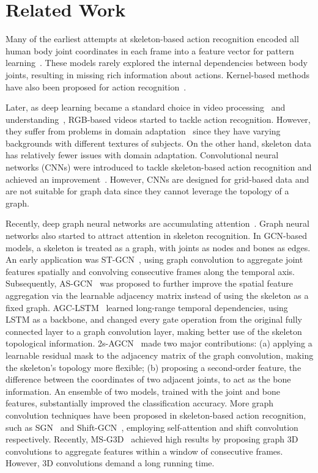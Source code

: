 \documentclass[journal,comsoc]{IEEEtran}
\begin{document}
\section{Related Work}
Many of the earliest attempts at skeleton-based action recognition encoded all human body joint coordinates in each frame into a feature vector for pattern learning~\cite{lei2017,lei_tip2019}. These models rarely explored the internal dependencies between body joints, resulting in missing rich information about actions. Kernel-based methods have also been proposed for action recognition~\cite{koniusz2016tensor, koniusz2020tensor}. 

Later, as deep learning became a standard choice in video processing~\cite{liu2021invertible,anwar2020densely} and understanding~\cite{li2020transferring,li2020word}, RGB-based videos started to tackle action recognition. However, they suffer from problems in domain adaptation~\cite{zhang2020clarinet, fang2020open, zhong2020does} since they have varying backgrounds with different textures of subjects. On the other hand, skeleton data has relatively fewer issues with domain adaptation. Convolutional neural networks (CNNs) were introduced to tackle skeleton-based action recognition and achieved an improvement~\cite{lei_iccv19}. However, CNNs are designed for grid-based data and are not suitable for graph data since they cannot leverage the topology of a graph. 

Recently, deep graph neural networks are accumulating attention~\cite{micheli2009neural, yao2022multi, li2020fast, wang2020haar}. Graph neural networks also started to attract attention in skeleton recognition. In GCN-based models, a skeleton is treated as a graph, with joints as nodes and bones as edges. An early application was ST-GCN~\cite{yan2018spatial}, using graph convolution to aggregate joint features spatially and convolving consecutive frames along the temporal axis. Subsequently, AS-GCN~\cite{Li_2019_CVPR} was proposed to further improve the spatial feature aggregation via the learnable adjacency matrix instead of using the skeleton as a fixed graph.  AGC-LSTM~\cite{Si_2019_CVPR} learned long-range temporal dependencies, using LSTM as a backbone, and changed every gate operation from the original fully connected layer to a graph convolution layer, making better use of the skeleton topological information.
2s-AGCN~\cite{shi2019two} made two major contributions: (a) applying a learnable residual mask to the adjacency matrix of the graph convolution, making the skeleton's topology more flexible; (b) proposing a second-order feature, the difference between the coordinates of two adjacent joints, to act as the bone information. An ensemble of two models, trained with the joint and bone features, substantially improved the classification accuracy. More graph convolution techniques have been proposed in skeleton-based action recognition, such as SGN~\cite{zhang2020semantics} and Shift-GCN~\cite{cheng2020skeleton}, employing self-attention and shift convolution respectively. Recently, MS-G3D~\cite{liu2020disentangling} achieved high results by proposing graph 3D convolutions to aggregate features within a window of consecutive frames. However, 3D convolutions demand a long running time.
\end{document}
